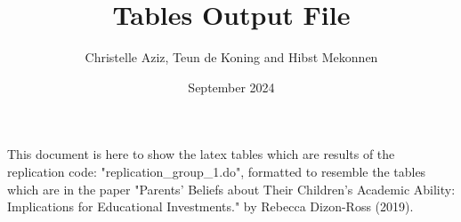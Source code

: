 \documentclass{article}
\title{Tables Output File}
\author{Christelle Aziz, Teun de Koning and Hibst Mekonnen}
\date{September 2024}
\begin{document}
\maketitle

This document is here to show the latex tables which are results of the replication code: "replication\_group\_1.do", formatted to resemble the tables which are in the paper "Parents' Beliefs about Their Children's Academic Ability: Implications for Educational Investments." by Rebecca Dizon-Ross (2019).




\begin{flushleft}
\begin{table}[htbp]
    \caption{Baseline summary statistics}
    \centering
\end{table}
\end{flushleft}
\end{document}
